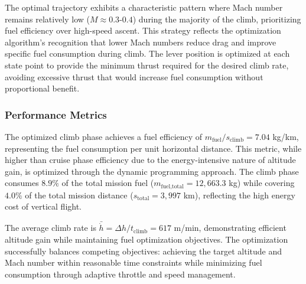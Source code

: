 The optimal trajectory exhibits a characteristic pattern where Mach number remains relatively low ($M \approx 0.3$-$0.4$) during the majority of the climb, prioritizing fuel efficiency over high-speed ascent. This strategy reflects the optimization algorithm's recognition that lower Mach numbers reduce drag and improve specific fuel consumption during climb. The lever position is optimized at each state point to provide the minimum thrust required for the desired climb rate, avoiding excessive thrust that would increase fuel consumption without proportional benefit.

\subsubsection{Performance Metrics}

The optimized climb phase achieves a fuel efficiency of $m_{\text{fuel}}/s_{\text{climb}} = 7.04$ kg/km, representing the fuel consumption per unit horizontal distance. This metric, while higher than cruise phase efficiency due to the energy-intensive nature of altitude gain, is optimized through the dynamic programming approach. The climb phase consumes $8.9\%$ of the total mission fuel ($m_{\text{fuel,total}} = 12,663.3$ kg) while covering $4.0\%$ of the total mission distance ($s_{\text{total}} = 3,997$ km), reflecting the high energy cost of vertical flight.

The average climb rate is $\bar{\dot{h}} = \Delta h / t_{\text{climb}} = 617$ m/min, demonstrating efficient altitude gain while maintaining fuel optimization objectives. The optimization successfully balances competing objectives: achieving the target altitude and Mach number within reasonable time constraints while minimizing fuel consumption through adaptive throttle and speed management.

 